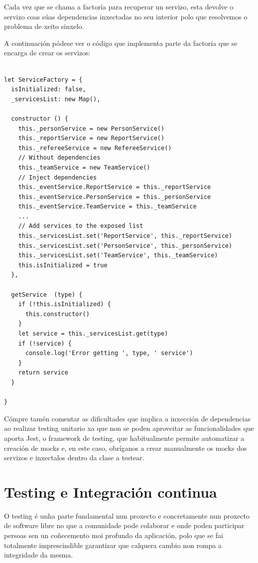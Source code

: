   Cada vez que se chama a factoría para recuperar un servizo, esta
devolve o servizo coas súas dependencias inxectadas no seu interior polo que 
resolvemos o problema de xeito sinxelo.

  A continuación pódese ver o código que implementa parte da factoría que se 
encarga de crear os servizos:

       \begin{lstlisting}[frame=single, caption=Fragmento da ServiceFactory.]

let ServiceFactory = {
  isInitialized: false,
  _servicesList: new Map(),

  constructor () {
    this._personService = new PersonService()
    this._reportService = new ReportService()
    this._refereeService = new RefereeService()
    // Without dependencies
    this._teamService = new TeamService()
    // Inject dependencies
    this._eventService.ReportService = this._reportService
    this._eventService.PersonService = this._personService
    this._eventService.TeamService = this._teamService
    ...
    // Add services to the exposed list
    this._servicesList.set('ReportService', this._reportService)
    this._servicesList.set('PersonService', this._personService)
    this._servicesList.set('TeamService', this._teamService)
    this.isInitialized = true
  },

  getService  (type) {
    if (!this.isInitialized) {
      this.constructor()
    }
    let service = this._servicesList.get(type)
    if (!service) {
      console.log('Error getting ', type, ' service')
    }
    return service
  }

}
    \end{lstlisting}

  Cómpre tamén comentar as dificultades que implica a inxección de dependencias 
ao realizar testing unitario xa que non se poden aproveitar as funcionalidades 
que aporta Jest, o framework de testing, que habitualmente permite automatizar 
a creación de mocks e, en este caso, obríganos a crear manualmente os mocks dos 
servizos e inxectalos dentro da clase a testear.

  \section{Testing e Integración continua}
  O testing é unha parte fundamental nun proxecto e concretamente nun proxecto 
de software libre no que a comunidade pode colaborar e onde poden 
participar persoas sen un coñecemento moi profundo da aplicación, polo que se 
fai totalmente imprescindible garantizar que calquera cambio non rompa a 
integridade da mesma.

